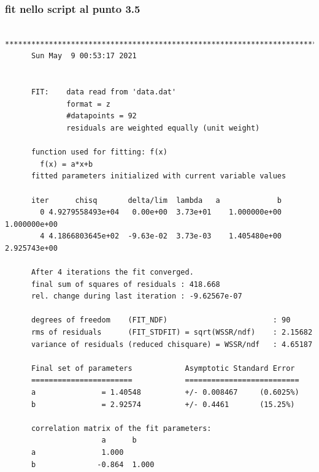 \documentclass{article}
\begin{document}
\subsubsection{fit nello script al punto 3.5}
\begin{verbatim}
      *******************************************************************************
      Sun May  9 00:53:17 2021


      FIT:    data read from 'data.dat'
              format = z
              #datapoints = 92
              residuals are weighted equally (unit weight)

      function used for fitting: f(x)
        f(x) = a*x+b
      fitted parameters initialized with current variable values

      iter      chisq       delta/lim  lambda   a             b            
        0 4.9279558493e+04   0.00e+00  3.73e+01    1.000000e+00   1.000000e+00
        4 4.1866803645e+02  -9.63e-02  3.73e-03    1.405480e+00   2.925743e+00

      After 4 iterations the fit converged.
      final sum of squares of residuals : 418.668
      rel. change during last iteration : -9.62567e-07

      degrees of freedom    (FIT_NDF)                        : 90
      rms of residuals      (FIT_STDFIT) = sqrt(WSSR/ndf)    : 2.15682
      variance of residuals (reduced chisquare) = WSSR/ndf   : 4.65187

      Final set of parameters            Asymptotic Standard Error
      =======================            ==========================
      a               = 1.40548          +/- 0.008467     (0.6025%)
      b               = 2.92574          +/- 0.4461       (15.25%)

      correlation matrix of the fit parameters:
                      a      b      
      a               1.000 
      b              -0.864  1.000 
\end{verbatim}
\end{document}
